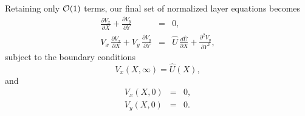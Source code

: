 Retaining only ${\cal O}(1)$ terms, our final set of normalized layer equations becomes
\begin{eqnarray}
\frac{\partial V_x}{\partial X} + \frac{\partial V_y}{\partial Y} &=& 0,\label{ej6.24}\\[0.5ex]
V_x\,\frac{\partial V_x}{\partial X} + V_y\,\frac{\partial V_y}{\partial Y} &=& \widehat{U}\,\frac{d\widehat{U}}{\partial X}
+ \frac{\partial^2 V_y}{\partial Y^2},\label{ej6.25}
\end{eqnarray}
subject to the boundary conditions
\begin{equation}
V_x(X,\infty)= \widehat{U}(X),
\end{equation}
and
\begin{eqnarray}
V_x(X,0) &=& 0,\\[0.5ex]
V_y(X,0) &=&0.\label{ej6.27}
\end{eqnarray}

